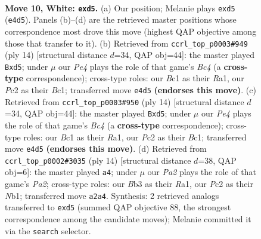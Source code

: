 \documentclass[11pt]{article}
\begin{document}
\clearpage

\begin{figure}[p]\centering
\begin{subfigure}{0.46\textwidth}\centering
\resizebox{\linewidth}{!}{%
\newchessgame
\chessboard[
  setfen={r1bqk2r/2p1bpp1/p1np4/1p1np2p/4P3/1B3N2/PPPP1PPP/R1BQR1K1 w kq - 0 10},
  showmover=false,
  pgfstyle=straightmove, color=movearrow, markmove={e4-d5}
]}
\caption{}
\end{subfigure}\hfill
\begin{subfigure}{0.46\textwidth}\centering
\resizebox{\linewidth}{!}{%
\newchessgame
\chessboard[
  setfen={r1bqk2r/pp2bppp/2np4/2pnp3/2B1P3/3P1N2/PPP2PPP/R1BQ1RK1 w kq - 0 8},
  showmover=false,
  pgfstyle=straightmove, color=movearrow, markmove={c4-d5}
]}
\caption{}
\end{subfigure}
\\[4pt]
\begin{subfigure}{0.46\textwidth}\centering
\resizebox{\linewidth}{!}{%
\newchessgame
\chessboard[
  setfen={r1bqk2r/pp2bppp/2np4/2pnp3/2B1P3/3P1N2/PPP2PPP/R1BQ1RK1 w kq - 0 8},
  showmover=false,
  pgfstyle=straightmove, color=movearrow, markmove={c4-d5}
]}
\caption{}
\end{subfigure}\hfill
\begin{subfigure}{0.46\textwidth}\centering
\resizebox{\linewidth}{!}{%
\newchessgame
\chessboard[
  setfen={r1bqk2r/2p1bppp/p1np1n2/1p2p3/4P3/1B3N2/PPPP1PPP/RNBQR1K1 w kq - 0 8},
  showmover=false,
  pgfstyle=straightmove, color=movearrow, markmove={a2-a4}
]}
\caption{}
\end{subfigure}
\caption{\textbf{Move 10, White: \texttt{exd5}.} (a) Our position; Melanie plays \texttt{exd5} (\texttt{e4d5}). Panels (b)--(d) are the retrieved master positions whose correspondence most drove this move (highest QAP objective among those that transfer to it). (b) Retrieved from \texttt{ccrl\_top\_p0003\#949} (ply 14) [structural distance $d$=34, QAP obj=44]: the master played \texttt{Bxd5}; under $\mu$ our \emph{Pe4} plays the role of that game's \emph{Bc4} (a \textbf{cross-type} correspondence); cross-type roles: our \emph{B}c1 as their \emph{R}a1, our \emph{P}c2 as their \emph{B}c1; transferred move \texttt{e4d5} \textbf{(endorses this move)}. (c) Retrieved from \texttt{ccrl\_top\_p0003\#950} (ply 14) [structural distance $d$=34, QAP obj=44]: the master played \texttt{Bxd5}; under $\mu$ our \emph{Pe4} plays the role of that game's \emph{Bc4} (a \textbf{cross-type} correspondence); cross-type roles: our \emph{B}c1 as their \emph{R}a1, our \emph{P}c2 as their \emph{B}c1; transferred move \texttt{e4d5} \textbf{(endorses this move)}. (d) Retrieved from \texttt{ccrl\_top\_p0002\#3035} (ply 14) [structural distance $d$=38, QAP obj=6]: the master played \texttt{a4}; under $\mu$ our \emph{Pa2} plays the role of that game's \emph{Pa2}; cross-type roles: our \emph{B}b3 as their \emph{R}a1, our \emph{P}c2 as their \emph{N}b1; transferred move \texttt{a2a4}. Synthesis: 2 retrieved analogs transferred to \texttt{exd5} (summed QAP objective 88, the strongest correspondence among the candidate moves); Melanie committed it via the \texttt{search} selector.}
\label{fig:thought-m18}
\end{figure}
\end{document}
